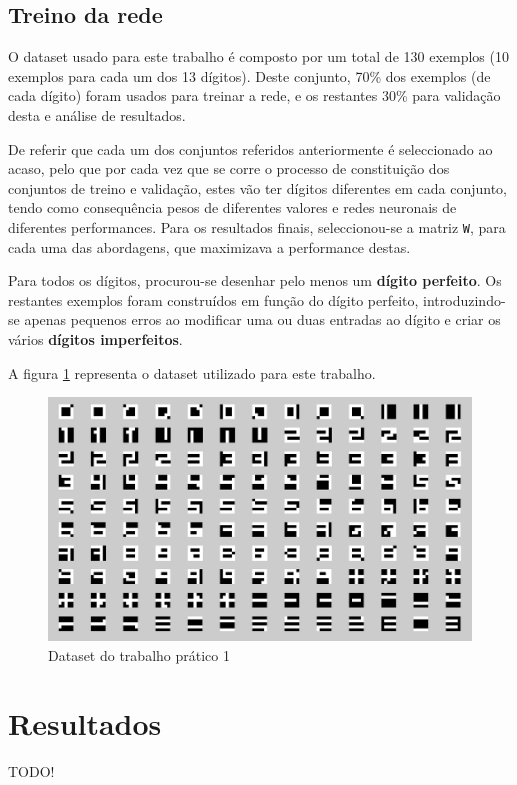 \documentclass{article}
\newenvironment{text-red}{\color{red}}{}
\begin{document}
\subsection{Treino da rede}
O dataset usado para este trabalho é composto por um total de 130 exemplos (10 exemplos para cada um dos 13 dígitos). Deste conjunto, 70\% dos exemplos (de cada dígito) foram usados para treinar a rede, e os restantes 30\% para validação desta e análise de resultados.

De referir que cada um dos conjuntos referidos anteriormente é seleccionado ao acaso, pelo que por cada vez que se corre o processo de constituição dos conjuntos de treino e validação, estes vão ter dígitos diferentes em cada conjunto, tendo como consequência pesos de diferentes valores e redes neuronais de diferentes performances. Para os resultados finais, seleccionou-se a matriz \texttt{W}, para cada uma das abordagens, que maximizava a performance destas.

Para todos os dígitos, procurou-se desenhar pelo menos um \textbf{dígito perfeito}. Os restantes exemplos foram construídos em função do dígito perfeito, introduzindo-se apenas pequenos erros ao modificar uma ou duas entradas ao dígito e criar os vários \textbf{dígitos imperfeitos}.

A figura \ref{nn_dataset} representa o dataset utilizado para este trabalho.

\begin{figure}[!h]
  \centering
  \includegraphics[width=5in]{figures/nn_dataset}
  \caption{Dataset do trabalho prático 1}
  \label{nn_dataset}
\end{figure}


\section{Resultados}
\begin{text-red} TODO!\end{text-red}
\end{document}
